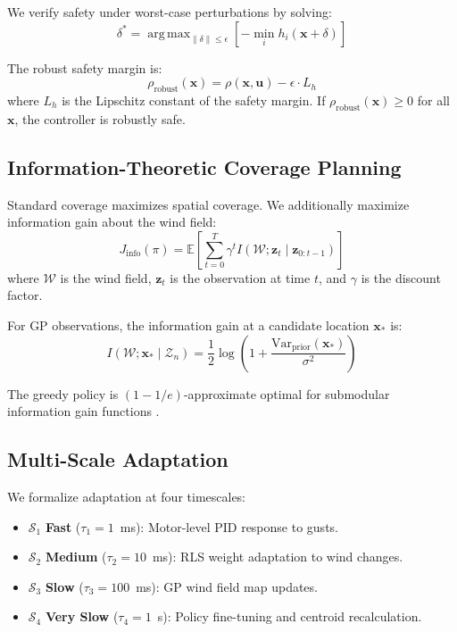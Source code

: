 \documentclass[12pt,a4paper,twocolumn]{article}
\newcommand{\cS}{\mathcal{S}}
\newcommand{\cW}{\mathcal{W}}
\newcommand{\cZ}{\mathcal{Z}}
\newcommand{\E}{\mathbb{E}}
\newcommand{\vect}[1]{\mathbf{#1}}
\DeclareMathOperator*{\argmax}{arg\,max}
\begin{document}
We verify safety under worst-case perturbations by solving:
\begin{equation}
    \delta^* = \argmax_{\|\delta\| \leq \epsilon}\left[-\min_i h_i(\vect{x} + \delta)\right]
    \label{eq:adversarial}
\end{equation}

The robust safety margin is:
\begin{equation}
    \rho_{\text{robust}}(\vect{x}) = \rho(\vect{x}, \vect{u}) - \epsilon \cdot L_h
    \label{eq:robust_margin}
\end{equation}
where $L_h$ is the Lipschitz constant of the safety margin. If $\rho_{\text{robust}}(\vect{x}) \geq 0$ for all $\vect{x}$, the controller is robustly safe.

\subsection{Information-Theoretic Coverage Planning}
\label{sec:info_planning}

Standard coverage maximizes spatial coverage. We additionally maximize information gain about the wind field:
\begin{equation}
    J_{\text{info}}(\pi) = \E\left[\sum_{t=0}^{T} \gamma^t I(\cW; \vect{z}_t \mid \vect{z}_{0:t-1})\right]
    \label{eq:info_objective}
\end{equation}
where $\cW$ is the wind field, $\vect{z}_t$ is the observation at time $t$, and $\gamma$ is the discount factor.

For GP observations, the information gain at a candidate location $\vect{x}_*$ is:
\begin{equation}
    I(\cW; \vect{x}_* \mid \cZ_n) = \frac{1}{2}\log\left(1 + \frac{\text{Var}_{\text{prior}}(\vect{x}_*)}{\sigma^2}\right)
    \label{eq:info_gain_gp}
\end{equation}

The greedy policy is $(1-1/e)$-approximate optimal for submodular information gain functions \citep{Nemhauser1978}.

\subsection{Multi-Scale Adaptation}
\label{sec:multiscale}

We formalize adaptation at four timescales:
\begin{itemize}[leftmargin=*]
    \item $\cS_1$ \textbf{Fast} ($\tau_1 = 1$~ms): Motor-level PID response to gusts.
    \item $\cS_2$ \textbf{Medium} ($\tau_2 = 10$~ms): RLS weight adaptation to wind changes.
    \item $\cS_3$ \textbf{Slow} ($\tau_3 = 100$~ms): GP wind field map updates.
    \item $\cS_4$ \textbf{Very Slow} ($\tau_4 = 1$~s): Policy fine-tuning and centroid recalculation.
\end{itemize}
\end{document}
